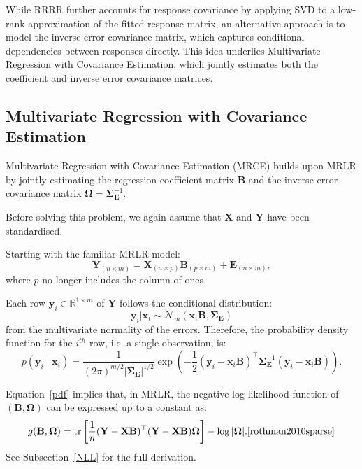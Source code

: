 \documentclass[11pt]{report} %
\begin{document}
While RRRR further accounts for response covariance by applying SVD to a low-rank approximation of the fitted response matrix, an alternative approach is to model the inverse error covariance matrix, which captures conditional dependencies between responses directly. This idea underlies Multivariate Regression with Covariance Estimation, which jointly estimates both the coefficient and inverse error covariance matrices.

\subsection{Multivariate Regression with Covariance Estimation}
Multivariate Regression with Covariance Estimation (MRCE) builds upon MRLR by jointly estimating the regression coefficient matrix \( \mathbf{B} \) and the inverse error covariance matrix \( \mathbf{\Omega} = \mathbf{\Sigma}^{-1}_\mathbf{E} \).

\noindent Before solving this problem, we again assume that $\mathbf{X}$ and $\mathbf{Y}$ have been standardised. 

Starting with the familiar MRLR model:
\[
\mathbf{Y}_{(n\times m)} = \mathbf{X}_{(n \times p)} \mathbf{B}_{(p \times m)} + \mathbf{E}_{(n \times m)},
\]
where $p$ no longer includes the column of ones.

Each row \( \mathbf{y}_i \in \mathbb{R}^{1 \times m} \) of \( \mathbf{Y} \) follows the conditional distribution:
\[\mathbf{y}_i|\mathbf{x}_i \sim \mathcal{N}_m(\mathbf{x}_i \mathbf{B}, \mathbf{\Sigma_E})\] 
from the multivariate normality of the errors. Therefore, the probability density function for the $i^{th}$ row, i.e. a single observation, is:
\begin{equation}
p(\mathbf{y}_i \mid \mathbf{x}_i) = \frac{1}{(2\pi)^{m/2} |\mathbf{\Sigma_E}|^{1/2}} \exp\left( -\frac{1}{2} (\mathbf{y}_i - \mathbf{x}_i \mathbf{B})^\top \mathbf{\Sigma}^{-1}_\mathbf{E} (\mathbf{y}_i - \mathbf{x}_i \mathbf{B}) \right).
\label{pdf}
\end{equation}

\noindent Equation~\ref{pdf} implies that, in MRLR, the negative log-likelihood function of \( (\mathbf{B}, \mathbf{\Omega}) \) can be expressed up to a constant as:
\begin{equation*}
    g(\mathbf{B}, \boldsymbol{\Omega}) = \text{tr} \left[ \frac{1}{n} (\mathbf{Y} - \mathbf{X} \mathbf{B})^\top (\mathbf{Y} - \mathbf{X} \mathbf{B}) \boldsymbol{\Omega} \right] - \log |\boldsymbol{\Omega}|.\cite{rothman2010sparse}
\end{equation*}
See Subsection~\ref{NLL} for the full derivation.
\end{document}

